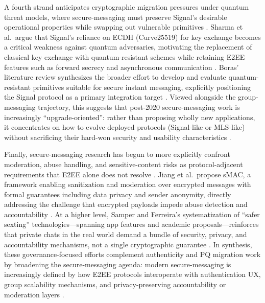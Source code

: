 A fourth strand anticipates cryptographic migration pressures under quantum threat models, where secure-messaging must preserve Signal’s desirable operational properties while swapping out vulnerable primitives \cite{sharma2023,boras2025}. Sharma et al.\ argue that Signal’s reliance on ECDH (Curve25519) for key exchange becomes a critical weakness against quantum adversaries, motivating the replacement of classical key exchange with quantum-resistant schemes while retaining E2EE features such as forward secrecy and asynchronous communication \cite{sharma2023}. Boras’ literature review synthesizes the broader effort to develop and evaluate quantum-resistant primitives suitable for secure instant messaging, explicitly positioning the Signal protocol as a primary integration target \cite{boras2025}. Viewed alongside the group-messaging trajectory, this suggests that post-2020 secure-messaging work is increasingly “upgrade-oriented”: rather than proposing wholly new applications, it concentrates on how to evolve deployed protocols (Signal-like or MLS-like) without sacrificing their hard-won security and usability characteristics \cite{oppliger2024,boras2025}.

Finally, secure-messaging research has begun to more explicitly confront moderation, abuse handling, and sensitive-content risks as protocol-adjacent requirements that E2EE alone does not resolve \cite{jiang2024,samper2025}. Jiang et al.\ propose sMAC, a framework enabling sanitization and moderation over encrypted messages with formal guarantees including data privacy and sender anonymity, directly addressing the challenge that encrypted payloads impede abuse detection and accountability \cite{jiang2024}. At a higher level, Samper and Ferreira’s systematization of “safer sexting” technologies—spanning app features and academic proposals—reinforces that private chats in the real world demand a bundle of security, privacy, and accountability mechanisms, not a single cryptographic guarantee \cite{samper2025}. In synthesis, these governance-focused efforts complement authenticity and PQ migration work by broadening the secure-messaging agenda: modern secure-messaging is increasingly defined by how E2EE protocols interoperate with authentication UX, group scalability mechanisms, and privacy-preserving accountability or moderation layers \cite{dowling2021,oppliger2024,jiang2024,samper2025}.

